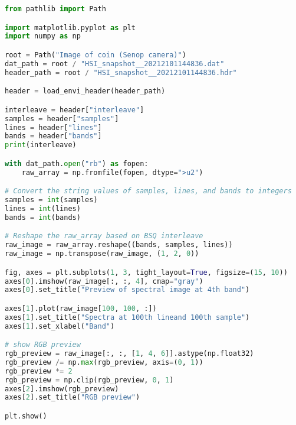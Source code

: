 \begin{lstlisting}[language=python, caption=Load spectral image of coin, label={code:load-coin}]
from pathlib import Path

import matplotlib.pyplot as plt
import numpy as np

root = Path("Image of coin (Senop camera)")
dat_path = root / "HSI_snapshot__20212101144836.dat"
header_path = root / "HSI_snapshot__20212101144836.hdr"

header = load_envi_header(header_path)

interleave = header["interleave"]
samples = header["samples"]
lines = header["lines"]
bands = header["bands"]
print(interleave)

with dat_path.open("rb") as fopen:
    raw_array = np.fromfile(fopen, dtype=">u2")

# Convert the string values of samples, lines, and bands to integers
samples = int(samples)
lines = int(lines)
bands = int(bands)

# Reshape the raw_array based on BSQ interleave
raw_image = raw_array.reshape((bands, samples, lines))
raw_image = np.transpose(raw_image, (1, 2, 0))

fig, axes = plt.subplots(1, 3, tight_layout=True, figsize=(15, 10))
axes[0].imshow(raw_image[:, :, 4], cmap="gray")
axes[0].set_title("Preview of spectral image at 4th band")

axes[1].plot(raw_image[100, 100, :])
axes[1].set_title("Spectra at 100th lineand 100th sample")
axes[1].set_xlabel("Band")

# show RGB preview
rgb_preview = raw_image[:, :, [1, 4, 6]].astype(np.float32)
rgb_preview /= np.max(rgb_preview, axis=(0, 1))
rgb_preview *= 2
rgb_preview = np.clip(rgb_preview, 0, 1)
axes[2].imshow(rgb_preview)
axes[2].set_title("RGB preview")

plt.show()
\end{lstlisting}
